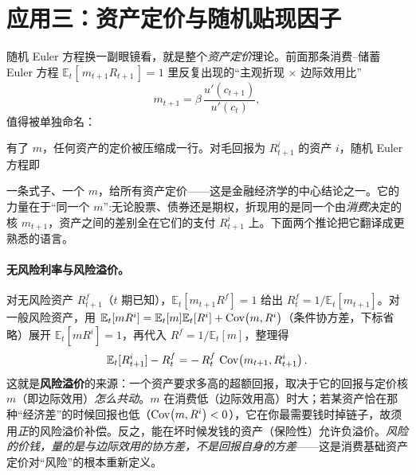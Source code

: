 
\section{应用三：资产定价与随机贴现因子}
\label{sec:stochdp-asset}

随机 Euler 方程换一副眼镜看，就是整个\emph{资产定价}理论。前面那条消费--储蓄 Euler 方程 $\mathbb{E}_t[\,m_{t+1}R_{t+1}\,]=1$ 里反复出现的``主观折现 $\times$ 边际效用比''
\[
    m_{t+1}=\beta\,\frac{u'(c_{t+1})}{u'(c_t)},
\]
值得被单独命名：


有了 $m$，任何资产的定价被压缩成一行。对毛回报为 $R^i_{t+1}$ 的资产 $i$，随机 Euler 方程即


一条式子、一个 $m$，给所有资产定价——这是金融经济学的中心结论之一。它的力量在于``同一个 $m$'':无论股票、债券还是期权，折现用的是同一个由\emph{消费}决定的核 $m_{t+1}$，资产之间的差别全在它们的支付 $R^i_{t+1}$ 上。下面两个推论把它翻译成更熟悉的语言。

\paragraph{无风险利率与风险溢价。}
对无风险资产 $R^f_{t+1}$（$t$ 期已知），$\mathbb{E}_t[m_{t+1}R^f]=1$ 给出 $R^f_t=1/\mathbb{E}_t[m_{t+1}]$。对一般风险资产，用 $\mathbb{E}_t[m R^i]=\mathbb{E}_t[m]\mathbb{E}_t[R^i]+\operatorname{Cov}\!\left(m,R^i\right)$（条件协方差，下标省略）展开 $\mathbb{E}_t[mR^i]=1$，再代入 $R^f=1/\mathbb{E}_t[m]$，整理得
\[
    \mathbb{E}_t[R^i_{t+1}]-R^f_t=-\,R^f_t\,\operatorname{Cov}\!\left(m_{t+1},R^i_{t+1}\right).
\]
这就是\textbf{风险溢价}的来源：一个资产要求多高的超额回报，取决于它的回报与定价核 $m$（即边际效用）\emph{怎么共动}。$m$ 在消费低（边际效用高）时大；若某资产恰在那种``经济差''的时候回报也低（$\operatorname{Cov}\!\left(m,R^i\right)<0$），它在你最需要钱时掉链子，故须用\emph{正}的风险溢价补偿。反之，能在坏时候发钱的资产（保险性）允许负溢价。\emph{风险的价钱，量的是与边际效用的协方差，不是回报自身的方差}——这是消费基础资产定价对``风险''的根本重新定义。

